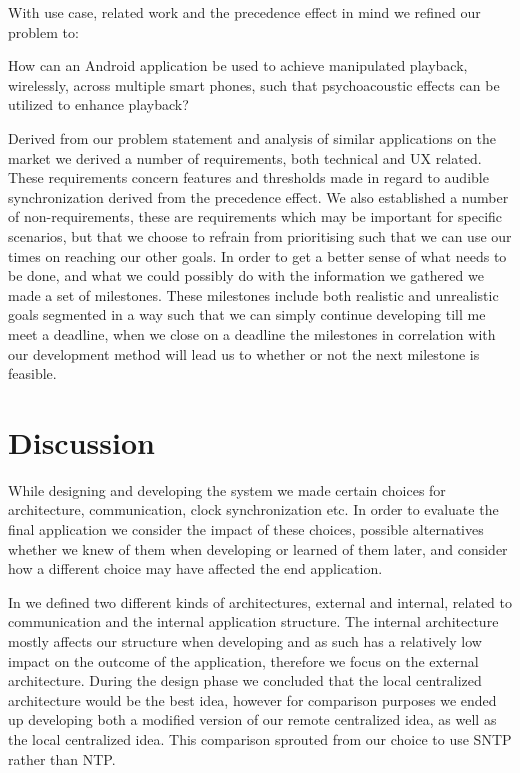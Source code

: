 With use case, related work and the precedence effect in mind we refined our problem to:
\begin{problemstatement}
    How can an Android application be used to achieve manipulated playback, wirelessly, across multiple smart phones, such that psychoacoustic effects can be utilized to enhance playback?
\end{problemstatement}

Derived from our problem statement and analysis of similar applications on the market we derived a number of requirements, both technical and \ac{UX} related.
These requirements concern features and thresholds made in regard to audible synchronization derived from the precedence effect.
We also established a number of non-requirements, these are requirements which may be important for specific scenarios, but that we choose to refrain from prioritising such that we can use our times on reaching our other goals.
In order to get a better sense of what needs to be done, and what we could possibly do with the information we gathered we made a set of milestones.
These milestones include both realistic and unrealistic goals segmented in a way such that we can simply continue developing till me meet a deadline, when we close on a deadline the milestones in correlation with our development method will lead us to whether or not the next milestone is feasible.



\section{Discussion}
While designing and developing the system we made certain choices for architecture, communication, clock synchronization etc.
In order to evaluate the final application we consider the impact of these choices, possible alternatives whether we knew of them when developing or learned of them later, and consider how a different choice may have affected the end application.

In  we defined two different kinds of architectures, external and internal, related to communication and the internal application structure.
The internal architecture mostly affects our structure when developing and as such has a relatively low impact on the outcome of the application, therefore we focus on the external architecture.
During the design phase we concluded that the local centralized architecture would be the best idea, however for comparison purposes we ended up developing both a modified version of our remote centralized idea, as well as the local centralized idea.
This comparison sprouted from our choice to use \ac{SNTP} rather than \ac{NTP}.

